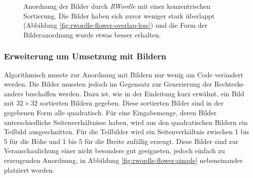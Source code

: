 \documentclass[12pt, ngerman, utf8]{article}
\begin{document}
\begin{figure}[hp]
    \noindent
    \caption{Anordnung der Bilder durch \textit{RWordle} mit einer konzentrischen Sortierung. Die Bilder haben sich zuvor weniger stark überlappt (Abbildung \ref{fig:rwordle-flower-overlap-less}) und die Form der Bilderanordnung wurde etwas besser erhalten.}
    \label{fig:rwordle-flower-con2}
\end{figure}
\subsubsection{Erweiterung um Umsetzung mit Bildern}
Algorithmisch musste zur Anordnung mit Bildern nur wenig am Code verändert werden. Die Bilder mussten jedoch im Gegensatz zur Generierung der Rechtecke anders beschaffen werden. Dazu ist, wie in der Einleitung kurz erwähnt, ein Bild mit $32\times32$ sortierten Bildern gegeben. Diese sortierten Bilder sind in der gegebenen Form alle quadratisch. Für eine Eingabemenge, deren Bilder unterschiedliche Seitenverhältnisse haben, wird aus den quadratischen Bildern ein Teilbild ausgeschnitten. Für die Teilbilder wird ein Seitenverhältnis zwischen 1 bis 5 für die Höhe und 1 bis 5 für die Breite zufällig erzeugt. Diese Bilder sind zur Veranschaulichung einer nicht besonders gut geeigneten, jedoch einfach zu erzeugenden Anordnung, in Abbildung \ref{fig:rwordle-flower-simple} nebeneinander platziert worden.
\end{document}
